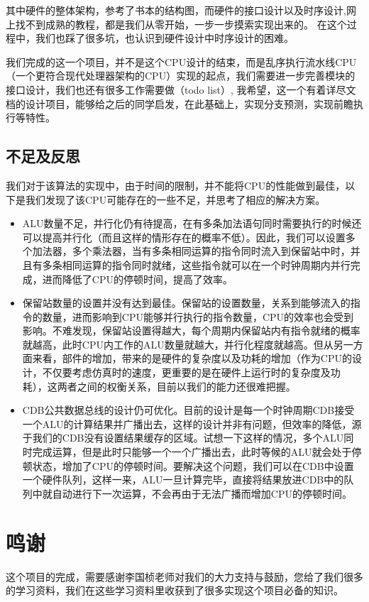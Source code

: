 \documentclass[twoside]{article}
\begin{document}
其中硬件的整体架构，参考了书本的结构图，而硬件的接口设计以及时序设计,网上找不到成熟的教程，都是我们从零开始，一步一步摸索实现出来的。
在这个过程中，我们也踩了很多坑，也认识到硬件设计中时序设计的困难。

我们完成的这一个项目，并不是这个CPU设计的结束，而是乱序执行流水线CPU（一个更符合现代处理器架构的CPU）实现的起点，我们需要进一步完善模块的接口设计，我们也还有很多工作需要做（todo list）, 我希望，这一个有着详尽文档的设计项目，能够给之后的同学启发，在此基础上，实现分支预测，实现前瞻执行等特性。

\subsection{不足及反思}
我们对于该算法的实现中，由于时间的限制，并不能将CPU的性能做到最佳，以下是我们发现了该CPU可能存在的一些不足，并思考了相应的解决方案。
\begin{itemize}
    \item ALU数量不足，并行化仍有待提高，在有多条加法语句同时需要执行的时候还可以提高并行化（而且这样的情形存在的概率不低）。因此，我们可以设置多个加法器，多个乘法器，当有多条相同运算的指令同时流入到保留站中时，并且有多条相同运算的指令同时就绪，这些指令就可以在一个时钟周期内并行完成，进而降低了CPU的停顿时间，提高了效率。
    \item 保留站数量的设置并没有达到最佳。保留站的设置数量，关系到能够流入的指令的数量，进而影响到CPU能够并行执行的指令数量，CPU的效率也会受到影响。不难发现，保留站设置得越大，每个周期内保留站内有指令就绪的概率就越高，此时CPU内工作的ALU数量就越大，并行化程度就越高。但从另一方面来看，部件的增加，带来的是硬件的复杂度以及功耗的增加（作为CPU的设计，不仅要考虑仿真时的速度，更重要的是在硬件上运行时的复杂度及功耗），这两者之间的权衡关系，目前以我们的能力还很难把握。
    \item CDB公共数据总线的设计仍可优化。目前的设计是每一个时钟周期CDB接受一个ALU的计算结果并广播出去，这样的设计并非有问题，但效率的降低，源于我们的CDB没有设置结果缓存的区域。试想一下这样的情况，多个ALU同时完成运算，但是此时只能够一个一个广播出去，此时等候的ALU就会处于停顿状态，增加了CPU的停顿时间。要解决这个问题，我们可以在CDB中设置一个硬件队列，这样一来，ALU一旦计算完毕，直接将结果放进CDB中的队列中就自动进行下一次运算，不会再由于无法广播而增加CPU的停顿时间。
\end{itemize}



\section{鸣谢}
这个项目的完成，需要感谢李国桢老师对我们的大力支持与鼓励，您给了我们很多的学习资料，我们在这些学习资料里收获到了很多实现这个项目必备的知识。
\end{document}
